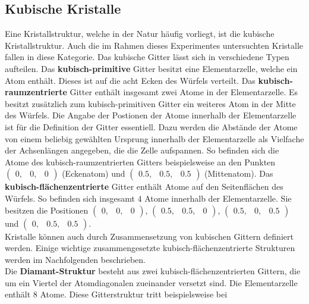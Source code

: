 \subsection{Kubische Kristalle}
%
Eine Kristallstruktur, welche in der Natur häufig vorliegt, ist die kubische Kristallstruktur. Auch die im
Rahmen dieses Experimentes untersuchten Kristalle fallen in diese Kategorie. Das kubische Gitter lässt sich
in verschiedene Typen aufteilen. Das \textbf{kubisch-primitive} Gitter besitzt eine Elementarzelle, welche
ein Atom enthält. Dieses ist auf die acht Ecken des Würfels verteilt. Das \textbf{kubisch-raumzentrierte}
Gitter enthält insgesamt zwei Atome in der Elementarzelle. Es besitzt zusätzlich zum kubisch-primitiven
Gitter ein weiteres Atom in der Mitte des Würfels. Die Angabe der Postionen der Atome innerhalb der
Elementarzelle ist für die Definition der Gitter essentiell. Dazu werden die Abstände der Atome von einem
beliebig gewählten Ursprung innerhalb der Elementarzelle als Vielfache der Achsenlängen angegeben, die die
Zelle aufspannen. So befinden sich die Atome des kubisch-raumzentrierten Gitters beispielsweise an den
Punkten $\begin{pmatrix}0, & 0, & 0 \end{pmatrix}$ (Eckenatom) und $\begin{pmatrix}0.5, & 0.5, & 0.5 \end{pmatrix}$
(Mittenatom). Das \textbf{kubisch-flächenzentrierte} Gitter enthält Atome auf den Seitenflächen des Würfels. So befinden sich insgesamt $4$ Atome innerhalb der Elementarzelle.
Sie besitzen die Positionen $\begin{pmatrix}0, & 0, & 0 \end{pmatrix}$, $\begin{pmatrix}0.5, & 0.5, & 0 \end{pmatrix}$,
$\begin{pmatrix}0.5, & 0, & 0.5 \end{pmatrix}$ und $\begin{pmatrix}0, & 0.5, & 0.5 \end{pmatrix}$.\\
Kristalle können auch durch Zusammensetzung von kubischen Gittern definiert werden. Einige wichtige zusammengesetzte
kubisch-flächenzentrierte Strukturen werden im Nachfolgenden beschrieben.\\
Die \textbf{Diamant-Struktur} besteht aus zwei kubisch-flächenzentrierten Gittern, die um ein Viertel der Atomdiagonalen
zueinander versetzt sind. Die Elementarzelle enthält $8$ Atome. Diese Gitterstruktur tritt beispielsweise bei
